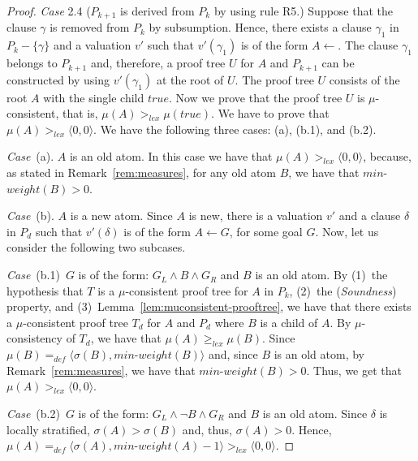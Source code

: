 \documentclass[english]{tlp}
\newcommand{\true}{\mathit{true}}
\renewcommand{\mathit}{\displaystyle}
\begin{document}
\begin{proof}
\medskip 

\noindent \emph{Case} 2.4 ($P_{k+1}$ is derived from $P_k$ by using
rule R5.) Suppose that the clause $\gamma$ is removed from $P_k$  by
subsumption.
Hence, there exists a clause $\gamma_1$ in
$P_k-\{\gamma\}$ and a valuation $v'$ such that $v'(\gamma_1)$ is of
the form $A \leftarrow$. The clause $\gamma_1$ belongs to $P_{k+1}$
and, therefore, a proof tree $U$ for $A$ and $P_{k+1}$ can be
constructed by using $v'(\gamma_1)$ at the root of $U$. The proof tree $U$
consists of the root $A$ with the single child $\true$. 
Now we prove that the proof tree $U$ is $\mu$-consistent, that is, 
$\mu(A)>_{\mathit lex}\mu(\mathit{true})$. We have to prove that $\mu(A)>_{\mathit lex}\langle0,0\rangle$. We have the following three cases: (a), (b.1), and (b.2).

\noindent 
{\it{Case}}~(a). $A$ is an old atom. In this case we have that 
$\mu(A)>_{\mathit{lex}}\langle0,0\rangle$,
because, as stated in Remark~\ref{rem:measures}, for any old atom $B$, we have that
$\mathit{min}$-$\mathit{weight}(B)\!>\!0$.



\noindent 
{\it{Case}}~(b). $A$ is a new atom. Since $A$ is new, there is a valuation $v'$ and
  a clause $\delta$  in $P_d$ such that
 $v'(\delta)$ is of the form $A \leftarrow G$, for some goal $G$.
 Now, let us consider the following two subcases.
 
\noindent 
{\it{Case}}~(b.1)~$G$ is of the form: $G_L\wedge B\wedge G_R$ and $B$ is an old atom. By (1)~the hypothesis that $T$ is a $\mu$-consistent proof tree for $A$ in $P_k$, 
(2)~the ({\it Soundness}) property, and (3)~Lemma~\ref{lem:muconsistent-prooftree}, 
we have that there 
exists a $\mu$-consistent proof tree $T_d$ for $A$ and $P_d$ where $B$ is a child of $A$.
By $\mu$-consistency of $T_d$, we have that $\mu(A)\geq_{\mathit{lex}}\mu(B)$.
Since 
$\mu(B)=_{\mathit{def}}\!\langle\sigma(B),{\mathit{min}}$-${\mathit{weight}}(B)\rangle$ and, since $B$ is an old atom, by
Remark~\ref{rem:measures}, we have that
${\mathit{min}}$-${\mathit{weight}}(B)\!>\!0$. Thus, we get that 
 $\mu(A)\!>_{\mathit lex}\!\langle0,0\rangle$.
 
\noindent 
{\it{Case}}~(b.2)~$G$ is of the form: $G_L\wedge \neg B\wedge G_R$ and $B$ is an old atom. Since $\delta$ is locally stratified, $\sigma(A)\!>\!\sigma(B)$ and, thus, $\sigma(A)\!>\!0$. Hence, 
$\mu(A)=_{\mathit{def}}\langle\sigma(A),{\mathit{min}}$-${\mathit{weight}}(A)\!-\!1\rangle >_{\mathit lex}\!\langle0,0\rangle$.


\end{proof}
\end{document}
